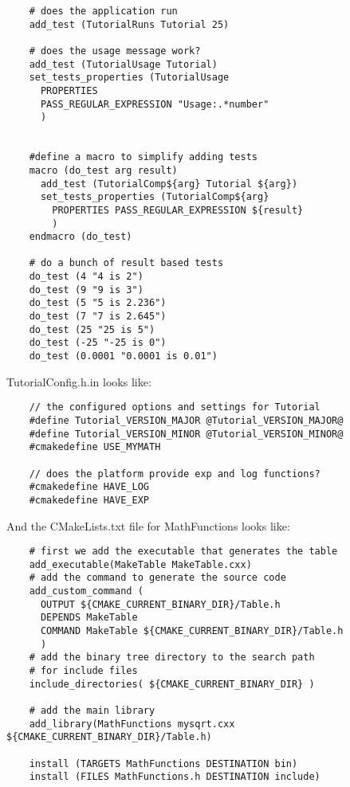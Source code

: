 \documentclass[UTF8,a4paper,8pt]{ctexart}
\begin{document}
\begin{lstlisting}
	# does the application run
	add_test (TutorialRuns Tutorial 25)
	 
	# does the usage message work?
	add_test (TutorialUsage Tutorial)
	set_tests_properties (TutorialUsage
	  PROPERTIES 
	  PASS_REGULAR_EXPRESSION "Usage:.*number"
	  )
	 
	 
	#define a macro to simplify adding tests
	macro (do_test arg result)
	  add_test (TutorialComp${arg} Tutorial ${arg})
	  set_tests_properties (TutorialComp${arg}
	    PROPERTIES PASS_REGULAR_EXPRESSION ${result}
	    )
	endmacro (do_test)
	 
	# do a bunch of result based tests
	do_test (4 "4 is 2")
	do_test (9 "9 is 3")
	do_test (5 "5 is 2.236")
	do_test (7 "7 is 2.645")
	do_test (25 "25 is 5")
	do_test (-25 "-25 is 0")
	do_test (0.0001 "0.0001 is 0.01")	
	\end{lstlisting}	

	TutorialConfig.h.in looks like:
	\begin{lstlisting}
	// the configured options and settings for Tutorial
	#define Tutorial_VERSION_MAJOR @Tutorial_VERSION_MAJOR@
	#define Tutorial_VERSION_MINOR @Tutorial_VERSION_MINOR@
	#cmakedefine USE_MYMATH
	 
	// does the platform provide exp and log functions?
	#cmakedefine HAVE_LOG
	#cmakedefine HAVE_EXP	
	\end{lstlisting}	
	
	And the CMakeLists.txt file for MathFunctions looks like:
	\begin{lstlisting}
	# first we add the executable that generates the table
	add_executable(MakeTable MakeTable.cxx)
	# add the command to generate the source code
	add_custom_command (
	  OUTPUT ${CMAKE_CURRENT_BINARY_DIR}/Table.h
	  DEPENDS MakeTable
	  COMMAND MakeTable ${CMAKE_CURRENT_BINARY_DIR}/Table.h
	  )
	# add the binary tree directory to the search path 
	# for include files
	include_directories( ${CMAKE_CURRENT_BINARY_DIR} )
	 
	# add the main library
	add_library(MathFunctions mysqrt.cxx ${CMAKE_CURRENT_BINARY_DIR}/Table.h)
	 
	install (TARGETS MathFunctions DESTINATION bin)
	install (FILES MathFunctions.h DESTINATION include)	
	\end{lstlisting}	


	
\end{document}
